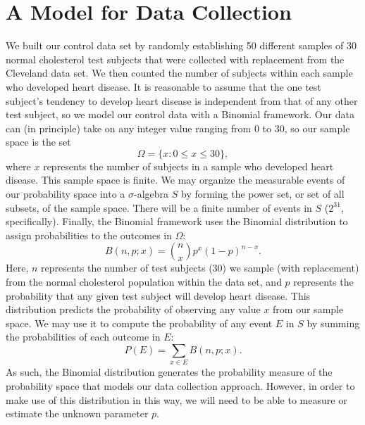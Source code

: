 \documentclass{amsart}
\begin{document}
\section{A Model for Data Collection}
We built our control data set by randomly establishing 50 different samples of 30 normal cholesterol test subjects that were collected with replacement from the Cleveland data set. We then counted the number of subjects within each sample who developed heart disease. It is reasonable to assume that the one test subject's tendency to develop heart disease is independent from that of any other test subject, so we model our control data with a Binomial framework. Our data can (in principle) take on any integer value ranging from 0 to 30, so our sample space is the set $$\Omega=\{x: 0\le x\le 30\},$$  where $x$ represents the number of subjects in a sample who developed heart disease. This sample space is finite. We may organize the measurable events of our probability space into a $\sigma$-algebra $S$ by forming the power set, or set of all subsets, of the sample space.  There will be a finite number of events in $S$ ($2^{31}$, specifically). Finally, the Binomial framework uses the Binomial distribution to assign probabilities to the outcomes in $\Omega$:
\[
B(n,p;x)=\binom{n}{x}p^x(1-p)^{n-x}.
\]
Here, $n$ represents the number of test subjects (30) we sample (with replacement) from the normal cholesterol population within the data set, and $p$ represents the probability that any given test subject will develop heart disease. This distribution predicts the probability of observing any value $x$ from our sample space. We may use it to compute the probability of any event $E$ in $S$ by summing the probabilities of each outcome in $E$:
\[
P(E)=\sum_{x\in E} B(n,p;x).
\]
As such, the Binomial distribution generates the probability measure of the probability space that models our data collection approach. However, in order to make use of this distribution in this way, we will need to be able to measure or estimate the unknown parameter $p$.
\end{document}
